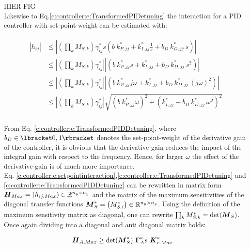 HIER FIG\\

Likewise to Eq.\ref{c:controller:e:TransformedPIDetuning} the interaction for a PID controller with set-point-weight can be estimated with:

\begin{align}
\begin{split}
\left|h_{ij}\right| &\leq \left| \left(\prod_k M_{S,k} \right) \gamma_{ij}^* s \left(b~k_{P,jj}^* + k_{I,jj}^* \frac{1}{s} + b_D~k_{D,jj}^*~s \right) \right| \\
&\leq \left| \left(\prod_k M_{S,k} \right) \gamma_{ij}^*\right| \left|\left(b~k_{P,jj}^* s+ k_{I,jj}^*+ b_D ~k_{D,jj}^*~s^2  \right) \right| \\
&\leq \left| \left(\prod_k M_{S,k} \right) \gamma_{ij}^*\right| \left|\left(b~k_{P,jj}^* j\omega+ k_{I,jj}^*+ b_D ~k_{D,jj}^*~(j\omega)^2  \right) \right| \\
&\leq \left| \left(\prod_k M_{S,k} \right) \gamma_{ij}^*\right| \sqrt{\left(b~k_{P,jj}^*\omega\right)^2+ \left(k_{I,jj}^*- b_D ~k_{D,jj}^*~\omega^2\right)^2} \\
\end{split}
\label{c:controller:e:TransformedPIDDetuning}
\end{align}


From Eq. \ref{c:controller:e:TransformedPIDDetuning}, where $b_D \in \lbracket 0,1 \rbracket$ denotes the set-point-weight of the derivative gain of the controller, it is obvious that the derivative gain reduces the impact of the integral gain with respect to the frequency. Hence, for larger $\omega$ the effect of the derivative gain is of much more importance.\\

Eq. \ref{c:controller:e:setpointinteraction},\ref{c:controller:e:TransformedPIDetuning} and \ref{c:controller:e:TransformedPIDDetuning} can be rewritten in matrix form $\mbox{\boldmath$H$}_{Max} = \left(h_{ij,Max}\right) \in \mathbb{R}^{n_y \times n_y}$ and the matrix of the maximum sensitivities of the diagonal transfer functions $\mbox{\boldmath$M$}_S^* = \left(M_{S,i}^*\right) \in \mathbb{R}^{n_y \times n_y}$. Using the definition of the maximum sensitivity matrix as diagonal, one can rewrite $\prod_k M_{S,k}^* = \det(\mbox{\boldmath$M$}_S) $. Once again dividing into a diagonal and anti diagonal matrix holds:

\begin{align}
\begin{split}
\mbox{\boldmath$H$}_{A,Max} &\geq \det(\mbox{\boldmath$M$}_S^*)~\mbox{\boldmath$\Gamma$}_A^*s~ \mbox{\boldmath$K$}_{r,Max}^* 
\end{split}
\label{c:controller:e:Hmax*}
\end{align}

